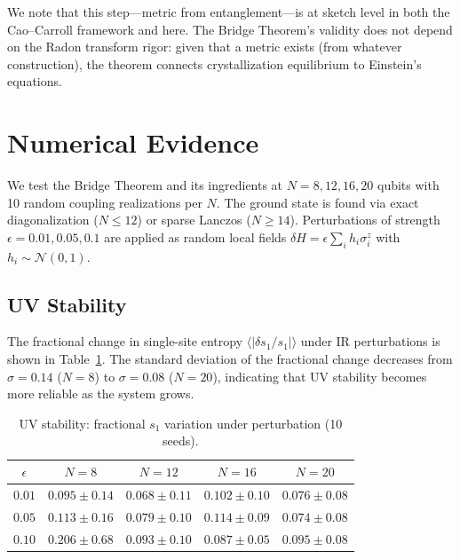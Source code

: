 \documentclass[aps,pra,twocolumn,superscriptaddress,floatfix]{revtex4-2}
\begin{document}
We note that this step---metric from entanglement---is at sketch level in both the Cao--Carroll framework and here.
The Bridge Theorem's validity does not depend on the Radon transform rigor: given that a metric exists (from whatever construction), the theorem connects crystallization equilibrium to Einstein's equations.


\section{Numerical Evidence}
\label{sec:numerics}

We test the Bridge Theorem and its ingredients at $N = 8, 12, 16, 20$ qubits with 10 random coupling realizations per $N$.
The ground state is found via exact diagonalization ($N \leq 12$) or sparse Lanczos ($N \geq 14$).
Perturbations of strength $\epsilon = 0.01, 0.05, 0.1$ are applied as random local fields $\delta H = \epsilon \sum_i h_i \sigma^z_i$ with $h_i \sim \mathcal{N}(0,1)$.

\subsection{UV Stability}

The fractional change in single-site entropy $\langle|\delta s_1 / s_1|\rangle$ under IR perturbations is shown in Table~\ref{tab:uv}.
The standard deviation of the fractional change decreases from $\sigma = 0.14$ ($N = 8$) to $\sigma = 0.08$ ($N = 20$), indicating that UV stability becomes more reliable as the system grows.

\begin{table}[h]
\caption{UV stability: fractional $s_1$ variation under perturbation (10 seeds).}
\label{tab:uv}
\begin{ruledtabular}
\begin{tabular}{ccccc}
$\epsilon$ & $N=8$ & $N=12$ & $N=16$ & $N=20$ \\
\hline
$0.01$ & $0.095 \pm 0.14$ & $0.068 \pm 0.11$ & $0.102 \pm 0.10$ & $0.076 \pm 0.08$ \\
$0.05$ & $0.113 \pm 0.16$ & $0.079 \pm 0.10$ & $0.114 \pm 0.09$ & $0.074 \pm 0.08$ \\
$0.10$ & $0.206 \pm 0.68$ & $0.093 \pm 0.10$ & $0.087 \pm 0.05$ & $0.095 \pm 0.08$ \\
\end{tabular}
\end{ruledtabular}
\end{table}
\end{document}
